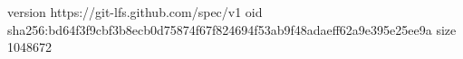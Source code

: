 version https://git-lfs.github.com/spec/v1
oid sha256:bd64f3f9cbf3b8ecb0d75874f67f824694f53ab9f48adaeff62a9e395e25ee9a
size 1048672
